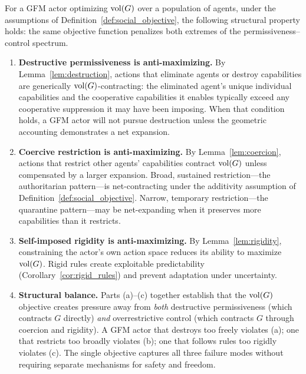 \begin{proposition}
\label{prop:self_balancing}
For a GFM actor optimizing $\operatorname{vol}(G)$ over a population of agents, under the
    assumptions of Definition~\ref{def:social_objective}, the following
    structural property holds: the same objective function penalizes both
    extremes of the permissiveness--control spectrum.

\begin{enumerate}
\item[\textbf{(a)}] \textbf{Destructive permissiveness is anti-maximizing.} By Lemma~\ref{lem:destruction}, actions that eliminate agents or destroy capabilities are generically $\operatorname{vol}(G)$-contracting: the eliminated agent's unique individual capabilities and the cooperative capabilities it enables typically exceed any cooperative suppression it may have been imposing. When that condition holds, a GFM actor will not pursue destruction unless the geometric accounting demonstrates a net expansion.

\item[\textbf{(b)}] \textbf{Coercive restriction is anti-maximizing.} By Lemma~\ref{lem:coercion}, actions that restrict other agents' capabilities contract $\operatorname{vol}(G)$ unless compensated by a larger expansion. Broad, sustained restriction---the authoritarian pattern---is net-contracting under the additivity assumption of Definition~\ref{def:social_objective}. Narrow, temporary restriction---the quarantine pattern---may be net-expanding when it preserves more capabilities than it restricts.

\item[\textbf{(c)}] \textbf{Self-imposed rigidity is anti-maximizing.} By Lemma~\ref{lem:rigidity}, constraining the actor's own action space reduces its ability to maximize $\operatorname{vol}(G)$. Rigid rules create exploitable predictability (Corollary~\ref{cor:rigid_rules}) and prevent adaptation under uncertainty.

\item[\textbf{(d)}] \textbf{Structural balance.} Parts (a)--(c) together establish that the $\operatorname{vol}(G)$ objective creates pressure away from \emph{both} destructive permissiveness (which contracts $G$ directly) \emph{and} overrestrictive control (which contracts $G$ through coercion and rigidity). A GFM actor that destroys too freely violates (a); one that restricts too broadly violates (b); one that follows rules too rigidly violates (c). The single objective captures all three failure modes without requiring separate mechanisms for safety and freedom.
\end{enumerate}
\end{proposition}

